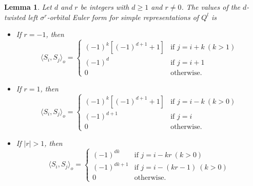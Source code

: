 \documentclass[reqno,12pt,a4paper]{amsart}
\newtheorem{lemma}[theorem]{Lemma}
\theoremstyle{remark}
\theoremstyle{definition}
\numberwithin{equation}{section}
\begin{document}
\begin{lemma}
\label{lem:orbital-Euler-form-linear}
Let $d$ and $r$ be integers with $d\geq 1$ and $r\neq 0$.
The values of the $d$-twisted left $\sigma^r$-orbital Euler form for simple representations of $Q^l$ is
\begin{itemize}
\item[(1)] If $r=-1$, then
\[
    \langle S_i,S_j\rangle_o=\begin{cases}
    (-1)^{k}[(-1)^{d+1}+1] & \text{if }j=i+k~(k>1)\\
    (-1)^{d} & \text{if } j=i+1\\
    0 & \text{otherwise}.
    \end{cases}
    \]

\item[(2)] If $r=1$, then
\[
    \langle S_i,S_j\rangle_o=\begin{cases}
    (-1)^{k}[(-1)^{d+1}+1] & \text{if }j=i-k~(k>0)\\
    (-1)^{d+1} & \text{if } j=i\\
    0 & \text{otherwise}.
    \end{cases}
    \]

\item[(3)] If $|r|>1$, then
\[
    \langle S_i,S_j\rangle_o=\begin{cases}
    (-1)^{dk} & \text{if }j=i-kr~(k>0)\\
    (-1)^{dk+1} & \text{if } j=i-(kr-1)~(k>0)\\
    0 & \text{otherwise}.
    \end{cases}
    \]
\end{itemize}
\end{lemma}
\end{document}
